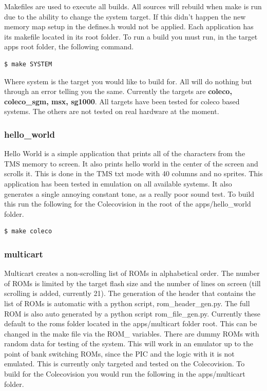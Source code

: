 \documentclass{article}
\begin{document}
  \par
  Makefiles are used to execute all builds. All sources will rebuild when make is run due to the ability to change the
  system target. If this didn't happen the new memory map setup in the defines.h would not be applied. Each application
  has its makefile located in its root folder. To run a build you must run, in the target apps root folder, the following
  command.

  \begin{lstlisting}[language=bash]
    $ make SYSTEM
  \end{lstlisting}

  Where system is the target you would like to build for. All will do nothing but through an error telling you the same.
  Currently the targets are \textbf{coleco, coleco\_sgm, msx, sg1000}. All targets have been tested for coleco based systems.
  The others are not tested on real hardware at the moment.

  \subsubsection{hello\_world}

  \par
  Hello World is a simple application that prints all of the characters from the TMS memory to screen. It also prints hello world in the
  center of the screen and scrolls it. This is done in the TMS txt mode with 40 columns and no sprites. This application has been
  tested in emulation on all available systems. It also generates a single annoying constant tone, as a really poor sound test. To build this
  run the following for the Colecovision in the root of the apps/hello\_world folder.

  \begin{lstlisting}[language=bash]
    $ make coleco
  \end{lstlisting}

  \subsubsection{multicart}

  \par
  Multicart creates a non-scrolling list of ROMs in alphabetical order. The number of ROMs is limited by the target flash size and the number of
  lines on screen (till scrolling is added, currently 21). The generation of the header that contains the list of ROMs is automatic with a python
  script, rom\_header\_gen.py. The full ROM is also auto generated by a python script rom\_file\_gen.py. Currently these default to the roms folder
  located in the apps/multicart folder root. This can be changed in the make file via the ROM\_\* variables. There are dummy ROMs with random data
  for testing of the system. This will work in an emulator up to the point of bank switching ROMs, since the PIC and the logic with it is not emulated.
  This is currently only targeted and tested on the Colecovision. To build for the Colecovision you would run the following in the apps/multicart folder.
\end{document}
